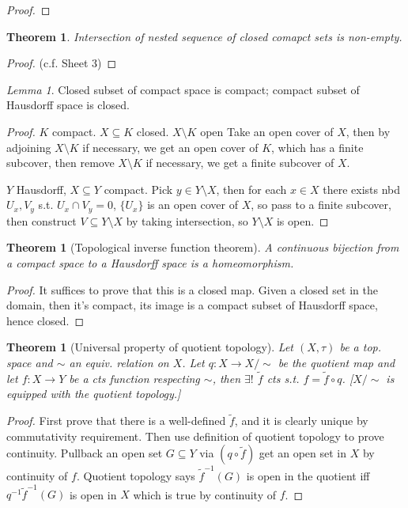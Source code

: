\documentclass{article}
\theoremstyle{definition}
\theoremstyle{remark}
\newtheorem{lem}[defn]{Lemma}
\theoremstyle{plain}
\newtheorem{thm}[defn]{Theorem}
\theoremstyle{definition}
\begin{document}
\begin{proof}
    
\end{proof}
\begin{thm}
    Intersection of nested sequence of closed   comapct sets is non-empty.
\end{thm}
\begin{proof}
    (c.f. Sheet 3)
\end{proof}
\begin{lem}
    Closed subset of compact space is compact; compact subset of Hausdorff space is closed. 
\end{lem}
\begin{proof}
    $K$ compact. $X\subseteq K$ closed. $X\setminus K$ open Take an open cover of $X$, then by adjoining $X\setminus K$ if necessary, we get an open cover of $K$, which has a finite subcover, then remove $X\setminus K$ if necessary, we get a finite subcover of $X$.

    $Y$ Hausdorff, $X\subseteq Y$ compact. Pick $y\in Y\setminus X$, then for each $x\in X$ there exists nbd $U_x, V_y$ s.t. $U_x\cap V_y=0$, $\{U_x\}$ is an open cover of $X$, so pass to a finite subcover, then construct $V\subseteq Y\setminus X$ by taking intersection, so $Y\setminus X$ is open.
\end{proof}
\begin{thm}[Topological inverse function theorem]
    A continuous bijection from a compact space to a Hausdorff space is a homeomorphism.
\end{thm}
\begin{proof}
    It suffices to prove that this is a closed map. Given a closed set in the domain, then it's compact, its image is a compact subset of Hausdorff space, hence closed.
\end{proof}
\begin{thm}[Universal property of quotient topology]
Let $(X,\tau)$ be a top. space and $\sim$ an equiv. relation on $X$. Let $q:X\to X/{\sim}$ be the quotient map and let $f:X\to Y$ be a cts function respecting $\sim$, then $\exists !$ $\tilde f$ cts s.t. $f=\tilde{f}\circ q$. [$X/{\sim}$ is equipped with the quotient topology.]    
\end{thm}
\begin{proof}
    First prove that there is a well-defined $\tilde{f}$, and it is clearly unique by commutativity requirement. Then use definition of quotient topology to prove continuity. Pullback an open set $G\subseteq Y$ via $(q\circ \tilde{f})$ get an open set in $X$ by continuity of $f$. Quotient topology says $\tilde{f}^{-1}(G)$ is open in the quotient iff $q^{-1}\tilde{f}^{-1}(G)$ is open in $X$ which is true by continuity of $f$.
\end{proof}
\end{document}
